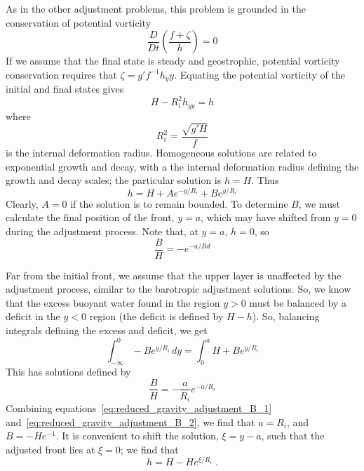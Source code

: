 \documentclass[11pt]{report}
\numberwithin{equation}{section}
\begin{document}
As in the other adjustment problems, this problem is grounded in the conservation of potential vorticity
\begin{equation}
    \frac{D}{Dt}\left(\frac{f + \zeta}{h}\right) = 0
\end{equation}
If we assume that the final state is steady and geostrophic, potential vorticity conservation requires that $\zeta = g' f^{-1} h_yy$.  Equating the potential vorticity of the initial and final states gives
\begin{equation}
    H - R_i^2 h_{yy} = h 
\end{equation}
where
\begin{equation}
    R_i^2 = \frac{\sqrt{g' H}}{f}
\end{equation}
is the internal deformation radius.  Homogeneous solutions are related to exponential growth and decay, with a the internal deformation radius defining the growth and decay scales; the particular solution is $h=H$.  Thus
\begin{equation}
    h = H + A e^{-y/R_i} + B e^{y/R_i}
\end{equation}
Clearly, $A=0$ if the solution is to remain bounded.  To determine $B$, we must calculate the final position of the front, $y=a$, which may have shifted from $y=0$ during the adjustment process.  Note that, at $y=a$, $h=0$, so
\begin{equation}
    \label{eq:reduced_gravity_adjustment_B_1}
    \frac{B}{H} = -e^{-a/Rd}
\end{equation}

Far from the initial front, we assume that the upper layer is unaffected by the adjustment process, similar to the barotropic adjustment solutions.  So, we know that the excess buoyant water found in the region $y>0$ must be balanced by a deficit in the $y<0$ region (the deficit is defined by $H-h$).  So, balancing integrals defining the excess and deficit, we get
\begin{equation}
    \int_{-\infty}^0 -B e^{y/R_i} \, dy = \int_0^a H + B e^{y/R_i}
\end{equation}
This has solutions defined by
\begin{equation}
    \label{eq:reduced_gravity_adjustment_B_2}
    \frac{B}{H} = - \frac{a}{R_i} e^{-a/R_i}
\end{equation}
Combining equations~\ref{eq:reduced_gravity_adjustment_B_1} and~\ref{eq:reduced_gravity_adjustment_B_2}, we find that $a = R_i$, and $B = -H e^{-1}$.  It is convenient to shift the solution, $\xi = y-a$, such that the adjusted front lies at $\xi = 0$; we find that
\begin{equation}
    h = H - H e^{\xi/R_i} \; .
\end{equation}
\end{document}
